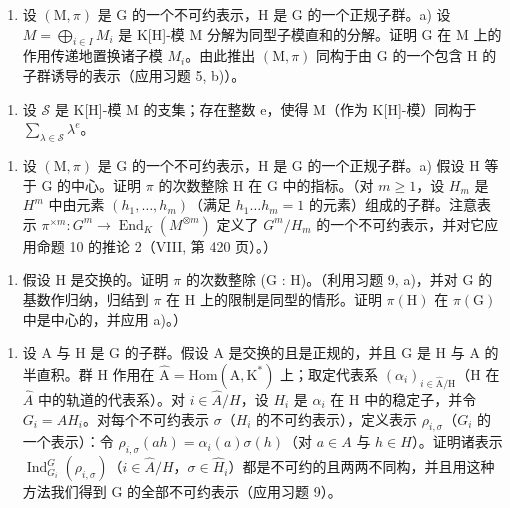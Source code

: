 \begin{enumerate}
\def\labelenumi{\arabic{enumi})}
\setcounter{enumi}{8}
\tightlist
\item
  设 \((\mathrm{M},\pi)\) 是 G 的一个不可约表示，H 是 G 的一个正规子群。a) 设 \(M=\bigoplus_{i\in I}M_{i}\) 是 K{[}H{]}-模 M 分解为同型子模直和的分解。证明 G 在 M 上的作用传递地置换诸子模 \(M_{i}\)。由此推出 \((\mathrm{M},\pi)\) 同构于由 G 的一个包含 H 的子群诱导的表示（应用习题 5, b)）。
\end{enumerate}

\begin{enumerate}
\def\labelenumi{\alph{enumi})}
\setcounter{enumi}{1}
\tightlist
\item
  设 \(\mathcal{S}\) 是 K{[}H{]}-模 M 的支集；存在整数 e，使得 M（作为 K{[}H{]}-模）同构于 \(\sum_{\lambda\in \mathcal{S}}\lambda^{e}\)。
\end{enumerate}

\begin{enumerate}
\def\labelenumi{\arabic{enumi})}
\setcounter{enumi}{9}
\tightlist
\item
  设 \((\mathrm{M},\pi)\) 是 G 的一个不可约表示，H 是 G 的一个正规子群。a) 假设 H 等于 G 的中心。证明 \(\pi\) 的次数整除 H 在 G 中的指标。（对 \(m \geqslant 1\)，设 \(H_{m}\) 是 \(H^{m}\) 中由元素 \((h_{1},\ldots,h_{m})\)（满足 \(h_{1}\ldots h_{m}=1\) 的元素）组成的子群。注意表示 \(\pi^{\times m}:G^{m}\to\operatorname{End}_{K}(M^{\otimes m})\) 定义了 \(G^{m}/H_{m}\) 的一个不可约表示，并对它应用命题 10 的推论 2（VIII, 第 420 页）。）
\end{enumerate}

\begin{enumerate}
\def\labelenumi{\alph{enumi})}
\setcounter{enumi}{1}
\tightlist
\item
  假设 H 是交换的。证明 \(\pi\) 的次数整除 (G : H)。（利用习题 9, a)，并对 G 的基数作归纳，归结到 \(\pi\) 在 H 上的限制是同型的情形。证明 \(\pi(\mathrm{H})\) 在 \(\pi(\mathrm{G})\) 中是中心的，并应用 a)。）
\end{enumerate}

\begin{enumerate}
\def\labelenumi{\arabic{enumi})}
\setcounter{enumi}{10}
\tightlist
\item
  设 A 与 H 是 G 的子群。假设 A 是交换的且是正规的，并且 G 是 H 与 A 的半直积。群 H 作用在 \(\widehat{\mathrm{A}} = \mathrm{Hom}(\mathrm{A}, \mathrm{K}^{*})\) 上；取定代表系 \((\alpha_{i})_{i \in \widehat{\mathrm{A}}/\mathrm{H}}\)（H 在 \(\widehat{A}\) 中的轨道的代表系）。对 \(i \in \widehat{A}/H\)，设 \(H_{i}\) 是 \(\alpha_{i}\) 在 H 中的稳定子，并令 \(G_{i} = AH_{i}\)。对每个不可约表示 \(\sigma\)（\(H_{i}\) 的不可约表示），定义表示 \(\rho_{i,\sigma}\)（\(G_{i}\) 的一个表示）：令 \(\rho_{i,\sigma}(ah) = \alpha_{i}(a)\sigma(h)\)（对 \(a \in A\) 与 \(h \in H\)）。证明诸表示 \(\operatorname{Ind}_{G_{i}}^{G}(\rho_{i,\sigma})\)（\(i \in \widehat{A}/H\)，\(\sigma \in \widehat{H}_{i}\)）都是不可约的且两两不同构，并且用这种方法我们得到 G 的全部不可约表示（应用习题 9）。
\end{enumerate}

